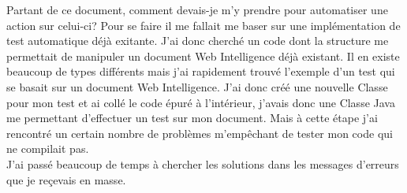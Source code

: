 Partant de ce document, comment devais-je m'y prendre pour automatiser une action sur celui-ci? Pour se faire il me fallait me baser sur une impl\'{e}mentation de test automatique d\'{e}j\`{a} exitante. J'ai donc cherché un code dont la structure me permettait de manipuler un document Web Intelligence d\'{e}j\`{a} existant. Il en existe beaucoup de types diff\'{e}rents mais j'ai rapidement trouv\'{e} l'exemple d'un test qui se basait sur un document Web Intelligence. J'ai donc cr\'{e}\'{e} une nouvelle \gls{Classe} pour mon test et ai coll\'{e} le code \'{e}pur\'{e} \`{a} l'int\'{e}rieur, j'avais donc une \gls{Classe} \gls{Java} me permettant d'effectuer un test sur mon document. Mais \`{a} cette \'{e}tape j'ai rencontr\'{e} un certain nombre de probl\`{e}mes m'emp\^{e}chant de tester mon code qui ne compilait pas.\\
J'ai pass\'{e} beaucoup de temps \`{a} chercher les solutions dans les messages d'erreurs que je re\c{c}evais en masse.\\

